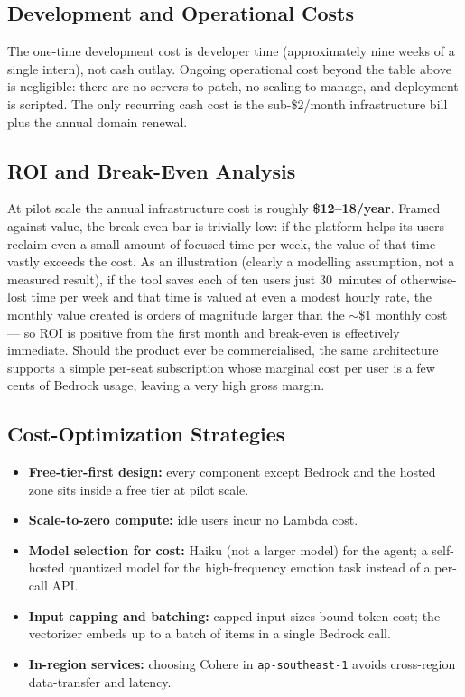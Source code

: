 \documentclass[a4paper,11pt]{article}
\begin{document}
	\subsection{Development and Operational Costs}
	The one-time development cost is developer time (approximately nine weeks of a single
	intern), not cash outlay. Ongoing operational cost beyond the table above is negligible:
	there are no servers to patch, no scaling to manage, and deployment is scripted. The only
	recurring cash cost is the sub-\$2/month infrastructure bill plus the annual domain renewal.

	\subsection{ROI and Break-Even Analysis}
	At pilot scale the annual infrastructure cost is roughly \textbf{\$12--18/year}. Framed
	against value, the break-even bar is trivially low: if the platform helps its users reclaim
	even a small amount of focused time per week, the value of that time vastly exceeds the
	cost. As an illustration (clearly a modelling assumption, not a measured result), if the
	tool saves each of ten users just 30~minutes of otherwise-lost time per week and that time
	is valued at even a modest hourly rate, the monthly value created is orders of magnitude
	larger than the $\sim$\$1 monthly cost --- so ROI is positive from the first month and
	break-even is effectively immediate. Should the product ever be commercialised, the same
	architecture supports a simple per-seat subscription whose marginal cost per user is a few
	cents of Bedrock usage, leaving a very high gross margin.

	\subsection{Cost-Optimization Strategies}
	\begin{itemize}
		\item \textbf{Free-tier-first design:} every component except Bedrock and the hosted zone
		      sits inside a free tier at pilot scale.
		\item \textbf{Scale-to-zero compute:} idle users incur no Lambda cost.
		\item \textbf{Model selection for cost:} Haiku (not a larger model) for the agent; a
		      self-hosted quantized model for the high-frequency emotion task instead of a
		      per-call API.
		\item \textbf{Input capping and batching:} capped input sizes bound token cost; the
		      vectorizer embeds up to a batch of items in a single Bedrock call.
		\item \textbf{In-region services:} choosing Cohere in \texttt{ap-southeast-1} avoids
		      cross-region data-transfer and latency.
	\end{itemize}
\end{document}
